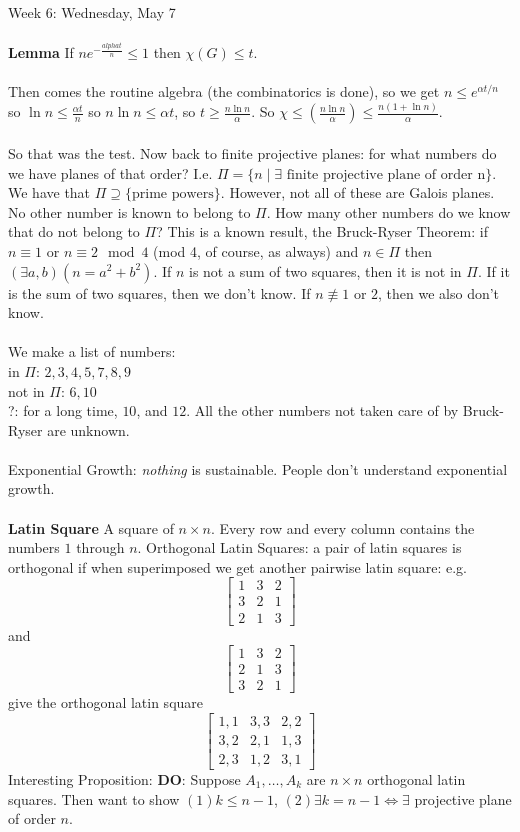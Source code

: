 \documentclass[12pt]{article}
\theoremstyle{remark}
\begin{document}
\begin{section}{Week 6: Wednesday, May 7}
\\\\\textbf{Lemma} If $ne^{-\frac{alpha t}{n}} \leq 1$ then $\chi(G) \leq t$.
\\\\
Then comes the routine algebra (the combinatorics is done), so we get $n \leq e^{\alpha t/n}$ so $\ln n \leq \frac{\alpha t}{n}$ so $n \ln n \leq \alpha t$, so $t \geq \frac{n \ln n}{\alpha}$. So $\chi \leq \left(\frac{n \ln n}{\alpha}\right) \leq \frac{n(1+ \ln n)}{\alpha}$.
\\\\
So that was the test. Now back to finite projective planes: for what numbers do we have planes of that order? I.e. $\Pi = \{n \mid \exists \text{ finite projective plane of order n}\}$. We have that $\Pi \supseteq \{\text{prime powers}\}$. However, not all of these are Galois planes. No other number is known to belong to $\Pi$. How many other numbers do we know that do not belong to $\Pi$? This is a known result, the Bruck-Ryser Theorem: if $n \equiv 1$ or $n \equiv 2 \mod 4$ (mod 4, of course, as always) and $n \in \Pi$ then $(\exists a,b)(n = a^2 + b^2)$. If $n$ is not a sum of two squares, then it is not in $\Pi$. If it is the sum of two squares, then we don't know. If $n \not \equiv 1$ or $2$, then we also don't know.
\\\\
We make a list of numbers:
\\in $\Pi$: $2,3,4,5,7,8,9$
\\not in $\Pi$: $6, 10$
\\ ?: for a long time, $10$, and $12$. All the other numbers not taken care of by Bruck-Ryser are unknown.
\\\\
Exponential Growth: \textit{nothing} is sustainable. People don't understand exponential growth.
\\\\
\textbf{Latin Square}
A square of $n \times n$. Every row and every column contains the numbers $1$ through $n$. Orthogonal Latin Squares: a pair of latin squares is orthogonal if when superimposed we get another pairwise latin square:
e.g.
$$
\left[
\begin{matrix}
1 & 3 & 2 \\ 3 & 2 & 1 \\ 2 & 1 & 3
\end{matrix}
\right]
$$
and 
$$
\left[
\begin{matrix}
1 & 3 & 2 \\ 2 & 1 & 3 \\ 3 & 2 & 1
\end{matrix}
\right]
$$
give the orthogonal latin square 
$$
\left[
\begin{matrix}
1,1 & 3,3 & 2,2 \\ 3,2 & 2,1 & 1,3 \\ 2,3 & 1,2 & 3,1
\end{matrix}
\right]
$$
Interesting Proposition: \textbf{DO}:
Suppose $A_1,\ldots,A_k$ are $n \times n$ orthogonal latin squares. Then want to show $(1) k \leq n-1$, $(2) \exists k = n-1 \iff \exists$ projective plane of order $n$.
\end{section}
\end{document}
